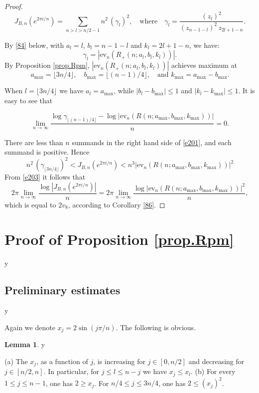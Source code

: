 \documentclass{amsart}
\theoremstyle{definition}
\newtheorem{lemma}[theorem]{Lemma}
\def\printname#1{
    \if\draft y
        \smash{\makebox[0pt]{\hspace{-0.5in}
            \raisebox{8pt}{\tt\tiny #1}}}
    \fi
}
\def\lbl#1{\label{#1}\printname{#1}}
\def\g{\gamma}
\def\ev{\mathrm{ev}}
\begin{document}
\begin{proof}
\begin{equation}
J_{B,n}(e^{2 \pi i/n})= \sum_{n>l>n/2-1} n^2\, (\g_l)^2,
\quad \text{where} \quad \g_l= \frac{ \left(
z_{l}\right)^2}{(z_{n-1-l})^2\, z_{2l+1-n}}.
\label{e201}
\end{equation}


By \eqref{84} below, with $a_l= l$, $b_l= n-1-l$ and $k_l=2l+1-n$, we have:
$$
\gamma_l=|\ev_n(R_+(n;a_l,b_l,k_l))|.
$$
 By Proposition \ref{prop.Rpm}, $|\ev_n(R_+(n;a_l,b_l,k_l))|$ achieves
maximum at
$$
a_{\max{}} = \lfloor 3n/4 \rfloor, \quad b_{\max{}} = \lfloor
(n-1)/4 \rfloor, \quad \text{and } k_{\max{}} = a_{\max{}} -b_{\max{}}.$$

 When $l= \lfloor
3n/4 \rfloor$ we have $a_l= a_{\max{}}$, while
$|b_l - b_{\max{}}| \le 1$ and $| k_l - k_{\max{}}| \le 1$.  It is easy to see that

\begin{equation}
\lim_{n\to \infty} \frac{\log \g_{\lfloor
(n-1)/4 \rfloor} -  \log |\ev_n(R(n;a_{\max{}},b_{\max{}},k_{\max{}}))|}{n}=0.
\label{e203}
\end{equation}

There are less than $n$ summands in the right hand side of \eqref{e201},
and each summand is positive.  Hence
$$
 n^2\,  \left( \g _{\lfloor
3n/4 \rfloor}\right) ^2 < J_{B,n}(e^{2 \pi i/n}) < n^3
 |\ev_n(R(n;a_{\max{}},b_{\max{}},k_{\max{}}))|^2
$$
From \eqref{e203} it follows that
$$
2\pi \lim_{n \to \infty} \frac{\log|J_{B,n}(e^{2 \pi i/n})|}{ n} = 2\pi
\lim_{n \to \infty} \frac{\log |\ev_n(R(n;a_{\max{}},b_{\max{}},k_{\max{}}))|^2}{n},
$$
which is equal to $2v_8$, according to Corollary \ref{86}.
\end{proof}


\section{Proof of Proposition \ref{prop.Rpm}}
\lbl{CCC}

\subsection{Preliminary estimates}
\lbl{sub.prelim71}

Again we denote $x_j= 2\sin (j \pi /n)$. The following is obvious.

\begin{lemma}
\lbl{85}
\rm{(a)}
The $x_j$, as a function of $j$,  is increasing for $j\in
[0,n/2]$ and   decreasing for $j \in [n/2,n]$. In particular, for
$j\le l \le n-j$ we have $x_j \le x_l$.
\newline
\rm{(b)}
For every $1\le j\le n-1$, one has $2 \ge x_j$. For $ n/4\le
j\le 3n/4$, one has $2 \le (x_j)^2$.
\end{lemma}
\end{document}

